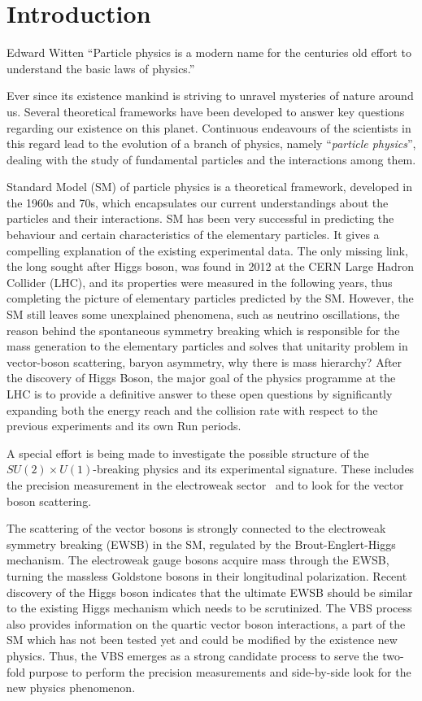 \chapter{Introduction}
\begin{chapquote}
{Edward Witten}
``Particle physics is a modern name for the centuries old effort to understand the basic laws of physics.''
\end{chapquote}
Ever since its existence mankind is striving to unravel mysteries of nature around us. Several theoretical frameworks have been developed to answer key questions regarding our existence on this planet.  Continuous endeavours of the scientists in this regard lead to the evolution of a branch of physics, namely ``\textit{particle physics}'', dealing with the study of fundamental particles and the interactions among them. 

Standard Model (SM) of particle physics is a theoretical framework, developed in the 1960s and 70s, which encapsulates our current understandings about the particles and their interactions.
SM has been very successful in predicting the behaviour and certain characteristics of the elementary particles. It gives a compelling explanation of the existing experimental data.
The only missing link, the long sought after Higgs boson, was found in 2012 at the CERN Large Hadron Collider (LHC), and its properties were measured in the following years, thus completing the picture of elementary particles predicted by the SM.
However, the SM still leaves some unexplained phenomena, such as neutrino oscillations, the reason behind the spontaneous symmetry breaking which is responsible for the mass generation to the elementary particles and solves that unitarity problem in vector-boson scattering, baryon asymmetry, why there is mass hierarchy?
After the discovery of Higgs Boson, the major goal of the physics programme at the LHC is to provide a definitive answer to these open questions by significantly expanding both the energy reach and the collision rate with respect to the previous experiments and its own Run periods.

A special effort is being made to investigate the possible structure of the $SU(2)\times U(1)$-breaking physics and its experimental signature. These includes the precision measurement in the electroweak sector~\cite{Baak2013} and to look for the vector boson scattering.

The scattering of the vector bosons is strongly connected to the electroweak symmetry breaking (EWSB) in the SM, regulated by the Brout-Englert-Higgs mechanism.
The electroweak gauge bosons acquire mass through the EWSB, turning the massless Goldstone bosons in their longitudinal polarization.
Recent discovery of the Higgs boson indicates that the ultimate EWSB should be similar to the existing Higgs mechanism which needs to be scrutinized.
The VBS process also provides information on the quartic vector boson interactions, a part of the SM which has not been tested yet and could be modified by the existence new physics.
Thus, the VBS  emerges as a strong candidate process to serve the two-fold purpose to perform the precision measurements and side-by-side look for the new physics phenomenon.  



